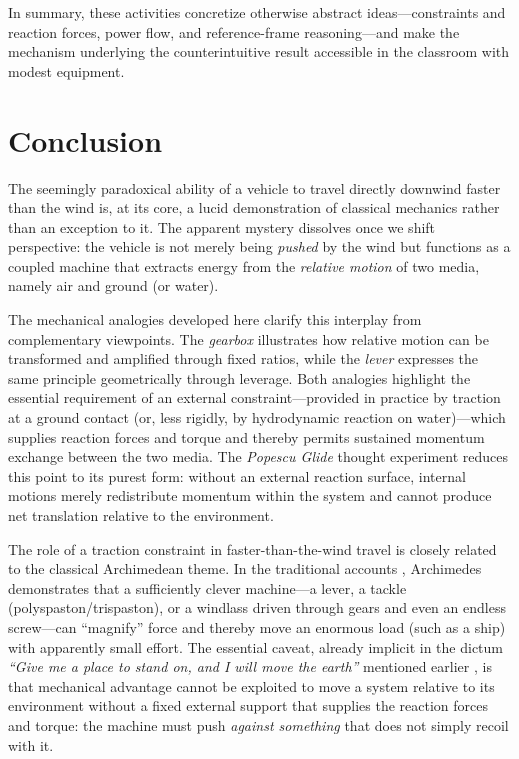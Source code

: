 \documentclass[reprint,aps,pra,longbibliography]{revtex4-2}
\begin{document}
In summary, these activities concretize otherwise abstract ideas---constraints
and reaction forces, power flow, and reference-frame reasoning---and make the
mechanism underlying the counterintuitive result accessible in the classroom
with modest equipment.

\section{Conclusion}

The seemingly paradoxical ability of a vehicle to travel directly downwind
faster than the wind is, at its core, a lucid demonstration of classical
mechanics rather than an exception to it. The apparent mystery dissolves once
we shift perspective: the vehicle is not merely being \emph{pushed} by the wind
but functions as a coupled machine that extracts energy from the \emph{relative
motion} of two media, namely air and ground (or water).

The mechanical analogies developed here clarify this interplay from
complementary viewpoints. The \emph{gearbox} illustrates how relative motion can
be transformed and amplified through fixed ratios, while the \emph{lever}
expresses the same principle geometrically through leverage. Both analogies
highlight the essential requirement of an external constraint---provided in
practice by traction at a ground contact (or, less rigidly, by hydrodynamic
reaction on water)---which supplies reaction forces and torque and thereby
permits sustained momentum exchange between the two media. The \emph{Popescu
Glide} thought experiment reduces this point to its purest form: without an
external reaction surface, internal motions merely redistribute momentum within
the system and cannot produce net translation relative to the environment.


The role of a traction constraint in faster-than-the-wind travel is closely
related to the classical Archimedean theme. In the traditional accounts
\cite[pp.~14--17]{dijksterhuis_archimedes_2014}, Archimedes demonstrates that a
sufficiently clever machine---a lever, a tackle (polyspaston/trispaston), or a
windlass driven through gears and even an endless screw---can ``magnify''
force and thereby move an enormous load (such as a ship) with apparently small
effort. The essential caveat, already implicit in the dictum
\emph{``Give me a place to stand on, and I will move the earth''} mentioned earlier
\cite[p.~15]{dijksterhuis_archimedes_2014}, is that mechanical advantage cannot
be exploited to move a system relative to its environment without a fixed
external support that supplies the reaction forces and torque: the machine must
push \emph{against something} that does not simply recoil with it.
\end{document}
